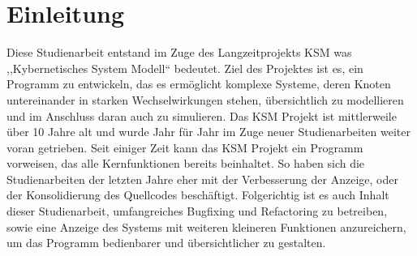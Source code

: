 \section{Einleitung}

Diese Studienarbeit entstand im Zuge des Langzeitprojekts KSM was ,,Kybernetisches System Modell`` bedeutet. Ziel des Projektes ist es, ein Programm zu entwickeln, das es ermöglicht komplexe Systeme, deren Knoten untereinander in starken Wechselwirkungen stehen, übersichtlich zu modellieren und im Anschluss daran auch zu simulieren. Das KSM Projekt ist mittlerweile über 10 Jahre alt und wurde Jahr für Jahr im Zuge neuer Studienarbeiten weiter voran getrieben. Seit einiger Zeit kann das KSM Projekt ein Programm vorweisen, das alle Kernfunktionen bereits beinhaltet. So haben sich die Studienarbeiten der letzten Jahre eher mit der Verbesserung der Anzeige, oder der Konsolidierung des Quellcodes beschäftigt. Folgerichtig ist es auch Inhalt dieser Studienarbeit, umfangreiches Bugfixing und Refactoring zu betreiben, sowie eine Anzeige des Systems mit weiteren kleineren Funktionen anzureichern, um das Programm bedienbarer und übersichtlicher zu gestalten.
